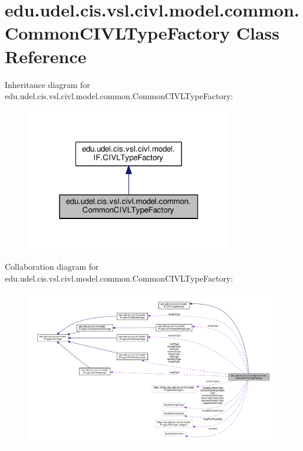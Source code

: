 \hypertarget{classedu_1_1udel_1_1cis_1_1vsl_1_1civl_1_1model_1_1common_1_1CommonCIVLTypeFactory}{}\section{edu.\+udel.\+cis.\+vsl.\+civl.\+model.\+common.\+Common\+C\+I\+V\+L\+Type\+Factory Class Reference}
\label{classedu_1_1udel_1_1cis_1_1vsl_1_1civl_1_1model_1_1common_1_1CommonCIVLTypeFactory}


Inheritance diagram for edu.\+udel.\+cis.\+vsl.\+civl.\+model.\+common.\+Common\+C\+I\+V\+L\+Type\+Factory\+:
\nopagebreak
\begin{figure}[H]
\begin{center}
\leavevmode
\includegraphics[width=256pt]{classedu_1_1udel_1_1cis_1_1vsl_1_1civl_1_1model_1_1common_1_1CommonCIVLTypeFactory__inherit__graph}
\end{center}
\end{figure}


Collaboration diagram for edu.\+udel.\+cis.\+vsl.\+civl.\+model.\+common.\+Common\+C\+I\+V\+L\+Type\+Factory\+:
\nopagebreak
\begin{figure}[H]
\begin{center}
\leavevmode
\includegraphics[width=350pt]{classedu_1_1udel_1_1cis_1_1vsl_1_1civl_1_1model_1_1common_1_1CommonCIVLTypeFactory__coll__graph}
\end{center}
\end{figure}
